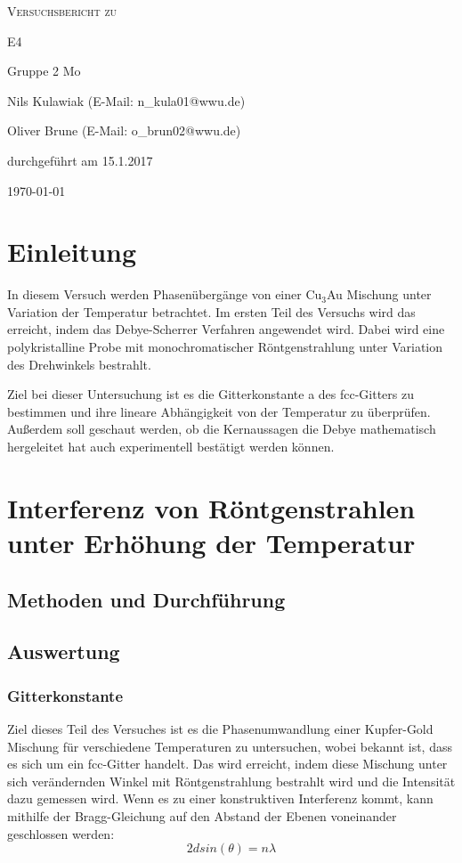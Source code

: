 \documentclass[
	a4paper,
	12pt,
	pagesize,
	ngerman
]{scrartcl}
\begin{document}
\begin{titlepage}
	\centering
	{\scshape\LARGE Versuchsbericht zu \par}
	\vspace{1cm}
	{\scshape\huge E4\par}
	\vspace{2.5cm}
	{\LARGE Gruppe 2 Mo\par}
	\vspace{0.5cm}
	{\large Nils Kulawiak (E-Mail: n\_kula01@wwu.de) \par}
	{\large Oliver Brune (E-Mail: o\_brun02@wwu.de) \par}
	\vfill
	durchgeführt am 15.1.2017\par
	
	\vfill

	{\large \today\par}
\end{titlepage}


\tableofcontents
	
	
\newpage
\section{Einleitung}
In diesem Versuch werden Phasenübergänge von einer Cu$_{3}$Au Mischung unter Variation der Temperatur betrachtet. Im ersten Teil des Versuchs wird das erreicht, indem das Debye-Scherrer Verfahren angewendet wird. Dabei wird eine polykristalline Probe mit monochromatischer Röntgenstrahlung unter Variation des Drehwinkels bestrahlt.

Ziel bei dieser Untersuchung ist es die Gitterkonstante a des fcc-Gitters zu bestimmen und ihre lineare Abhängigkeit von der Temperatur zu überprüfen. Außerdem soll geschaut werden, ob die Kernaussagen die Debye mathematisch hergeleitet hat auch experimentell bestätigt werden können.
\section{Interferenz von Röntgenstrahlen unter Erhöhung der Temperatur}
\subsection{Methoden und Durchführung}

\subsection{Auswertung}
\subsubsection{Gitterkonstante}
Ziel dieses Teil des Versuches ist es die Phasenumwandlung einer Kupfer-Gold Mischung für verschiedene Temperaturen zu untersuchen, wobei bekannt ist, dass es sich um ein fcc-Gitter handelt. Das wird erreicht, indem diese Mischung unter sich verändernden Winkel mit Röntgenstrahlung bestrahlt wird und die Intensität dazu gemessen wird. Wenn es zu einer konstruktiven Interferenz kommt, kann mithilfe der Bragg-Gleichung auf den Abstand der Ebenen voneinander geschlossen werden:
\begin{equation}
2d sin(\theta) = n \lambda
\label{bragg}
\end{equation}
\end{document}
